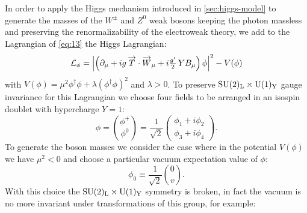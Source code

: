 In order to apply the Higgs mechanism introduced in \cref{sec:higgs-model} to
generate the masses of the $W^\pm$ and $Z^0$ weak bosons keeping the photon
massless and preserving the renormalizability of the electroweak theory, we add
to the Lagrangian of \cref{eq:13} the Higgs Lagrangian:
\begin{equation}
  \label{eq:45}
  \mathcal{L}_{\phi} = \left| \left(\partial_{\mu} + i g\, \overrightarrow{T} \cdot
      \overrightarrow{W}_{\mu} + i \tfrac{g'}{2}\,Y B_{\mu} \right)\phi \right|^2 - V(\phi)
\end{equation}
with
$V(\phi) = \mu^{2}\phi^{\dagger} \phi + \lambda ( \phi^{\dagger} \phi )^{2}$ and
$\lambda > 0$. To preserve $\mathrm{SU}(2)_\mathrm{L} \times \mathrm{U}(1)_\mathrm{Y}$ gauge invariance for this
Lagrangian we choose four fields to be arranged in an isospin doublet with
hypercharge $Y = 1$:
 \begin{equation}
  \label{eq:46}
  \phi = \binom{\phi^{+}}{\phi^{0}} =
  \frac{1}{\sqrt{2}}
  \begin{pmatrix}
    \phi_{1} + i \phi_{2} \\
    \phi_{3} + i \phi_{4}
  \end{pmatrix}.
\end{equation}
To generate the boson masses we consider the case where in the potential
$V(\phi)$ we have $\mu^2 < 0$ and choose a particular vacuum expectation value
of $\phi$:
\begin{equation}
  \label{eq:47}
  \phi_{0} \equiv \frac{1}{\sqrt{2}} \binom{0}{v}.
\end{equation}
With this choice the $\mathrm{SU}(2)_\mathrm{L} \times \mathrm{U}(1)_\mathrm{Y}$ symmetry is broken, in fact the
vacuum is no more invariant under transformations of this group, for example:
